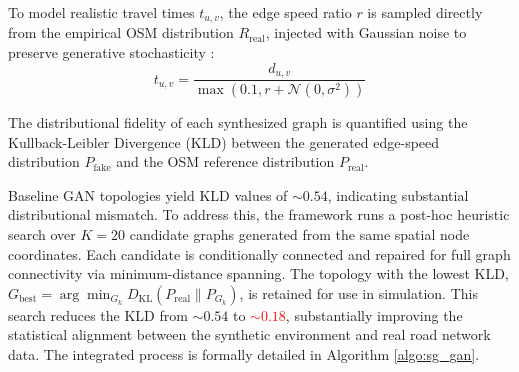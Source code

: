 \documentclass[conference]{IEEEtran}
\begin{document}
To model realistic travel times $t_{u,v}$, the edge speed ratio $r$ is sampled directly from the empirical OSM distribution $R_{\text{real}}$, injected with Gaussian noise to preserve generative stochasticity \cite{daganzo1994cell}:
\begin{equation}
t_{u,v} = \frac{d_{u,v}}{\max(0.1, r + \mathcal{N}(0, \sigma^2))}
\end{equation}

The distributional fidelity of each synthesized graph is quantified using the Kullback-Leibler Divergence (KLD) \cite{kullback1951information} between the generated edge-speed distribution $P_{\text{fake}}$ and the OSM reference distribution $P_{\text{real}}$.

Baseline GAN topologies yield KLD values of $\sim0.54$, indicating substantial distributional mismatch. To address this, the framework runs a post-hoc heuristic search over $K=20$ candidate graphs generated from the same spatial node coordinates. Each candidate is conditionally connected and repaired for full graph connectivity via minimum-distance spanning. The topology with the lowest KLD, $G_{\text{best}} = \arg \min_{G_k} D_{\text{KL}}(P_{\text{real}} \| P_{G_k})$, is retained for use in simulation. This search reduces the KLD from $\sim0.54$ to \textcolor{red}{$\sim0.18$}, substantially improving the statistical alignment between the synthetic environment and real road network data. The integrated process is formally detailed in Algorithm \ref{algo:sg_gan}.
\end{document}
